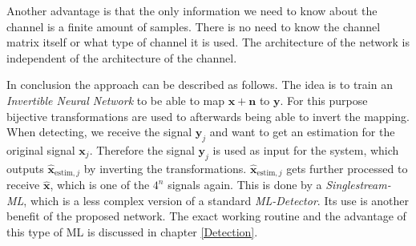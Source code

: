 \documentclass[oneside]{msvreport}%
\newcommand{\B}[1]{\boldsymbol{#1}}
\newcommand{\Bhat}[1]{\boldsymbol{\hat{#1}}}
\begin{document}
\begin{center}
\end{center}
Another advantage is that the only information we need to know about the channel is a finite amount of samples. There is no need to know the channel matrix itself or what type of channel it is used. The architecture of the network is independent of the architecture of the channel.

\begin{center}
\end{center}
In conclusion the approach can be described as follows. The idea is to train an \emph{Invertible Neural Network} to be able to map $\B{x} + \B{n}$ to $\B{y}$. For this purpose bijective transformations are used to afterwards being able to invert the mapping. When detecting, we receive the signal $\B{y}_j$ and want to get an estimation for the original signal $\B{x}_j$. Therefore the signal $\B{y}_j$ is used as input for the system, which outputs $\Bhat{x}_{\text{estim}, j}$ by inverting the transformations. $\Bhat{x}_{\text{estim}, j}$ gets further processed to receive $\Bhat{x}$, which is one of the $4^n$ signals again. This is done by a \emph{Singlestream-ML}, which is a less complex version of a standard \emph{ML-Detector}. Its use is another benefit of the proposed network. The exact working routine and the advantage of this type of ML is discussed in chapter \ref{Detection}.
\end{document}
